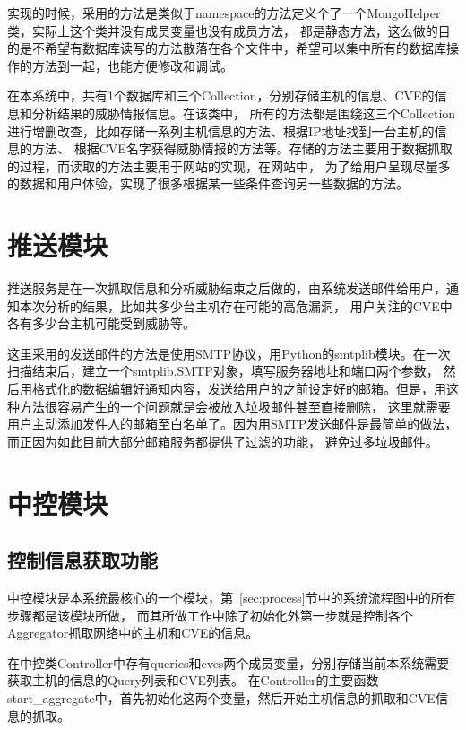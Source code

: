 实现的时候，采用的方法是类似于namespace的方法定义个了一个MongoHelper类，实际上这个类并没有成员变量也没有成员方法，
都是静态方法，这么做的目的是不希望有数据库读写的方法散落在各个文件中，希望可以集中所有的数据库操作的方法到一起，也能方便修改和调试。

在本系统中，共有1个数据库和三个Collection，分别存储主机的信息、CVE的信息和分析结果的威胁情报信息。在该类中，
所有的方法都是围绕这三个Collection进行增删改查，比如存储一系列主机信息的方法、根据IP地址找到一台主机的信息的方法、
根据CVE名字获得威胁情报的方法等。存储的方法主要用于数据抓取的过程，而读取的方法主要用于网站的实现，在网站中，
为了给用户呈现尽量多的数据和用户体验，实现了很多根据某一些条件查询另一些数据的方法。

\section{推送模块}
\label{sec:notification-module}

推送服务是在一次抓取信息和分析威胁结束之后做的，由系统发送邮件给用户，通知本次分析的结果，比如共多少台主机存在可能的高危漏洞，
用户关注的CVE中各有多少台主机可能受到威胁等。

这里采用的发送邮件的方法是使用SMTP协议，用Python的smtplib模块。在一次扫描结束后，建立一个smtplib.SMTP对象，填写服务器地址和端口两个参数，
然后用格式化的数据编辑好通知内容，发送给用户的之前设定好的邮箱。但是，用这种方法很容易产生的一个问题就是会被放入垃圾邮件甚至直接删除，
这里就需要用户主动添加发件人的邮箱至白名单了。因为用SMTP发送邮件是最简单的做法，而正因为如此目前大部分邮箱服务都提供了过滤的功能，
避免过多垃圾邮件。

\section{中控模块}
\label{cha:controller-module}

\subsection{控制信息获取功能}
\label{sec:controller-aggregation}

中控模块是本系统最核心的一个模块，第~\ref{sec:process}节中的系统流程图中的所有步骤都是该模块所做，
而其所做工作中除了初始化外第一步就是控制各个Aggregator抓取网络中的主机和CVE的信息。

在中控类Controller中存有queries和cves两个成员变量，分别存储当前本系统需要获取主机的信息的Query列表和CVE列表。
在Controller的主要函数start\_aggregate中，首先初始化这两个变量，然后开始主机信息的抓取和CVE信息的抓取。

